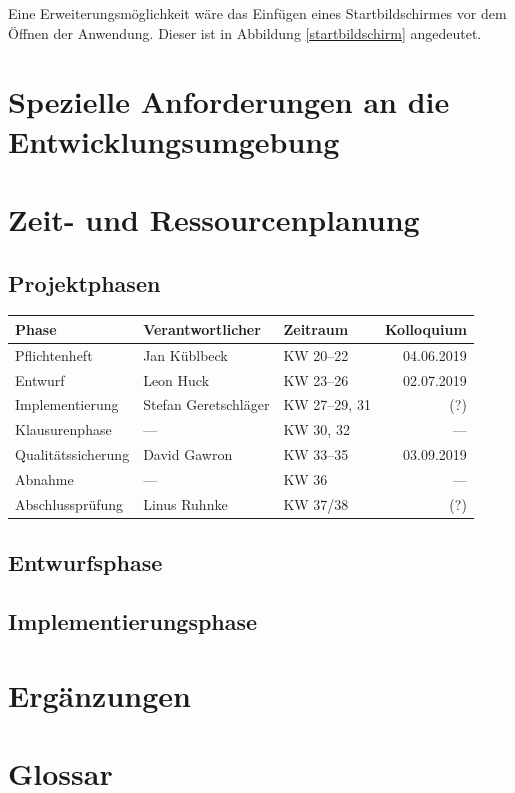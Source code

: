 \documentclass[parskip=full]{scrartcl}
\begin{document}
Eine Erweiterungsmöglichkeit wäre das Einfügen eines Startbildschirmes vor dem Öffnen der Anwendung. Dieser ist in Abbildung \ref{startbildschirm} angedeutet.

\section{Spezielle Anforderungen an die Entwicklungsumgebung}\label{entwicklungsumgebung}

\section{Zeit- und Ressourcenplanung}\label{zeit}

\subsection{Projektphasen}

\begin{tabular}{| l | l | l | r |}
	\hline
	\textbf{Phase} & \textbf{Verantwortlicher} & \textbf{Zeitraum} & \textbf{Kolloquium} \\ \hline
	Pflichtenheft & Jan Küblbeck & KW 20–22 & 04.06.2019 \\
	Entwurf & Leon Huck & KW 23–26 & 02.07.2019 \\
	Implementierung & Stefan Geretschläger & KW 27–29, 31 & (?) \\
	Klausurenphase & — & KW 30, 32 & — \\
	Qualitätssicherung & David Gawron & KW 33–35 & 03.09.2019 \\
	Abnahme & — & KW 36 & — \\
	Abschlussprüfung & Linus Ruhnke & KW 37/38 & (?) \\
	\hline
\end{tabular}

\subsection{Entwurfsphase}

\subsection{Implementierungsphase}

\section{Ergänzungen}\label{erweiterung}

\section{Glossar}\label{glossar}

\renewcommand*{\glossarysection}[2][]{}	%
\printnoidxglossaries				%
\end{document}
